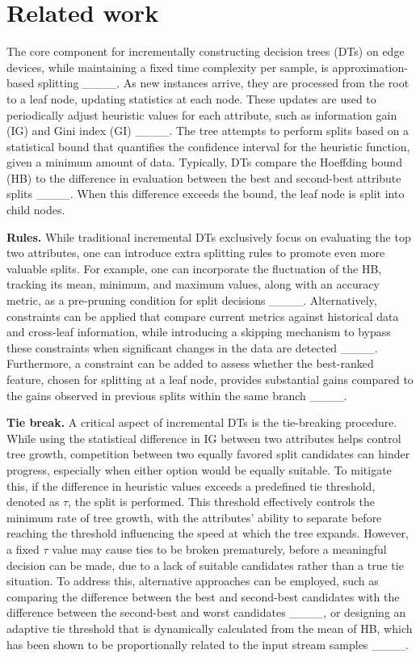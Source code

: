 \section{Related work}
\label{sec:related}

The core component for incrementally constructing decision trees (DTs) on edge devices, while maintaining a fixed time complexity per sample, is approximation-based splitting ____. As new instances arrive, they are processed from the root to a leaf node, updating statistics at each node. These updates are used to periodically adjust heuristic values for each attribute, such as information gain (IG) and Gini index (GI) ____. The tree attempts to perform splits based on a statistical bound that quantifies the confidence interval for the heuristic function, given a minimum amount of data. Typically, DTs compare the Hoeffding bound (HB) to the difference in evaluation between the best and second-best attribute splits ____. When this difference exceeds the bound, the leaf node is split into child nodes.

\textbf{Rules.} While traditional incremental DTs exclusively focus on evaluating the top two attributes, one can introduce extra splitting rules to promote even more valuable splits. For example, one can incorporate the fluctuation of the HB, tracking its mean, minimum, and maximum values, along with an accuracy metric, as a pre-pruning condition for split decisions ____. Alternatively, constraints can be applied that compare current metrics against historical data and cross-leaf information, while introducing a skipping mechanism to bypass these constraints when significant changes in the data are detected ____. Furthermore, a constraint can be added to assess whether the best-ranked feature, chosen for splitting at a leaf node, provides substantial gains compared to the gains observed in previous splits within the same branch ____.

\textbf{Tie break.} A critical aspect of incremental DTs is the tie-breaking procedure. While using the statistical difference in IG between two attributes helps control tree growth, competition between two equally favored split candidates can hinder progress, especially when either option would be equally suitable. To mitigate this, if the difference in heuristic values exceeds a predefined tie threshold, denoted as $\tau$, the split is performed. This threshold effectively controls the minimum rate of tree growth, with the attributes’ ability to separate before reaching the threshold influencing the speed at which the tree expands. However, a fixed $\tau$ value may cause ties to be broken prematurely, before a meaningful decision can be made, due to a lack of suitable candidates rather than a true tie situation. To address this, alternative approaches can be employed, such as comparing the difference between the best and second-best candidates with the difference between the second-best and worst candidates ____, or designing an adaptive tie threshold that is dynamically calculated from the mean of HB, which has been shown to be proportionally related to the input stream samples ____.

